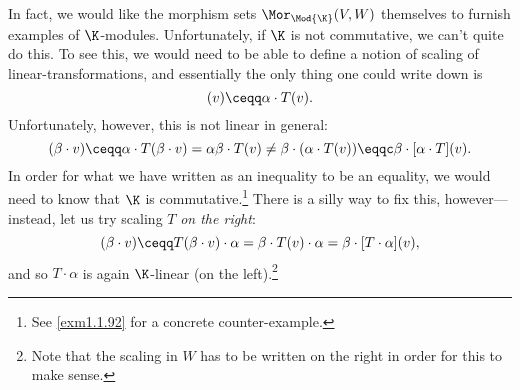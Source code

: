 In fact, we would like the morphism sets $\Mor _{\Mod{\K}}(V,W)$ themselves to furnish examples of $\K$-modules.  Unfortunately, if $\K$ is not commutative, we can't quite do this.  To see this, we would need to be able to define a notion of scaling of linear-transformations, and essentially the only thing one could write down is
\begin{equation}
	[\alpha \cdot T](v)\ceqq \alpha \cdot T(v).
\end{equation}
Unfortunately, however, this is not linear in general:
\begin{equation}
	[\alpha \cdot T](\beta \cdot v)\ceqq \alpha \cdot T(\beta \cdot v)=\alpha \beta \cdot T(v)\neq \beta \cdot (\alpha \cdot T(v))\eqqc \beta \cdot [\alpha \cdot T](v).
\end{equation}
In order for what we have written as an inequality to be an equality, we would need to know that $\K$ is commutative.\footnote{See \cref{exm1.1.92} for a concrete counter-example.}  There is a silly way to fix this, however---instead, let us try scaling $T$ \emph{on the right}:
\begin{equation}
	[T\cdot \alpha ](\beta \cdot v)\ceqq T(\beta \cdot v)\cdot \alpha =\beta \cdot T(v)\cdot \alpha =\beta \cdot [T\cdot \alpha ](v),
\end{equation}
and so $T\cdot \alpha$ is again $\K$-linear (on the left).\footnote{Note that the scaling in $W$ has to be written on the right in order for this to make sense.}

